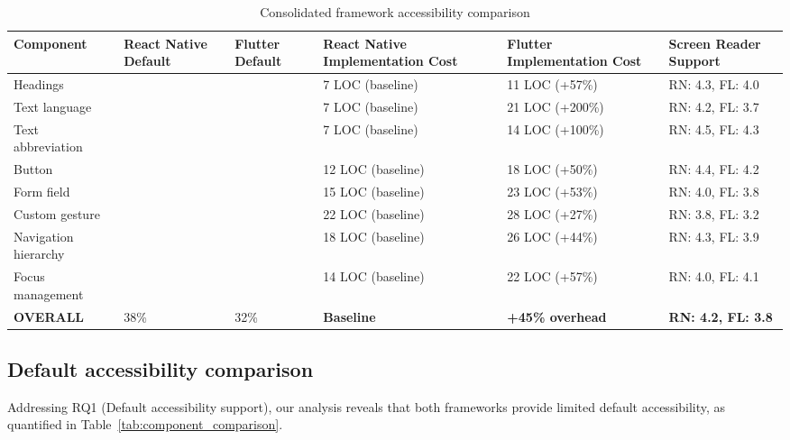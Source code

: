 \begin{table}[ht]
\caption{Consolidated framework accessibility comparison}
\label{tab:consolidated_comparison}
\centering
\begin{tabular}{|C{2.3cm}|C{1.7cm}|C{1.7cm}|C{2.3cm}|C{2.3cm}|C{2.3cm}|}
\hline
\textbf{Component} & \textbf{React Native Default} & \textbf{Flutter Default} & \textbf{React Native Implementation Cost} & \textbf{Flutter Implementation Cost} & \textbf{Screen Reader Support} \\
\hline
Headings &  &  & 7 LOC (baseline) & 11 LOC (+57\%) & RN: 4.3, FL: 4.0 \\
\hline
Text language &  &  & 7 LOC (baseline) & 21 LOC (+200\%) & RN: 4.2, FL: 3.7 \\
\hline
Text abbreviation &  &  & 7 LOC (baseline) & 14 LOC (+100\%) & RN: 4.5, FL: 4.3 \\
\hline
Button &  &  & 12 LOC (baseline) & 18 LOC (+50\%) & RN: 4.4, FL: 4.2 \\
\hline
Form field &  &  & 15 LOC (baseline) & 23 LOC (+53\%) & RN: 4.0, FL: 3.8 \\
\hline
Custom gesture &  &  & 22 LOC (baseline) & 28 LOC (+27\%) & RN: 3.8, FL: 3.2 \\
\hline
Navigation hierarchy &  &  & 18 LOC (baseline) & 26 LOC (+44\%) & RN: 4.3, FL: 3.9 \\
\hline
Focus management &  &  & 14 LOC (baseline) & 22 LOC (+57\%) & RN: 4.0, FL: 4.1 \\
\hline
\textbf{OVERALL} & 38\% & 32\% & \textbf{Baseline} & \textbf{+45\% overhead} & \textbf{RN: 4.2, FL: 3.8} \\
\hline
\end{tabular}
\end{table}

\FloatBarrier

\subsection{Default accessibility comparison}
\label{subsec:default-accessibility}

Addressing RQ1 (Default accessibility support), our analysis reveals that both frameworks provide limited default accessibility, as quantified in Table~\ref{tab:component_comparison}.

